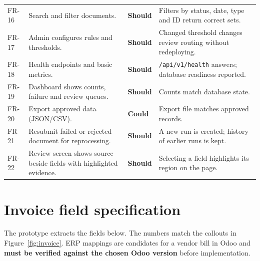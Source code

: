 \documentclass[11pt,a4paper]{report}
\newcommand{\should}{\textcolor{amber!85!black}{\sffamily\bfseries Should}}
\newcommand{\could}{\textcolor{tealdark}{\sffamily\bfseries Could}}
\begin{document}
{\begin{longtable}{L{1.2cm}L{5.6cm}L{1.3cm}L{5.4cm}}
FR-16 & Search and filter documents. & \should & Filters by status, date, type and ID return correct sets.\\
FR-17 & Admin configures rules and thresholds. & \should & Changed threshold changes review routing without redeploying.\\
FR-18 & Health endpoints and basic metrics. & \should & \texttt{/api/v1/health} answers; database readiness reported.\\
FR-19 & Dashboard shows counts, failure and review queues. & \should & Counts match database state.\\
FR-20 & Export approved data (JSON/CSV). & \could & Export file matches approved records.\\
FR-21 & Resubmit failed or rejected document for reprocessing. & \should & A new run is created; history of earlier runs is kept.\\
FR-22 & Review screen shows source beside fields with highlighted evidence. & \should & Selecting a field highlights its region on the page.\\
\hline
\end{longtable}}

\section{Invoice field specification}\label{sec:fields}
The prototype extracts the fields below. The numbers match the callouts in Figure~\ref{fig:invoice}. ERP mappings are candidates for a vendor bill in Odoo and \textbf{must be verified against the chosen Odoo version} before implementation.
\end{document}
